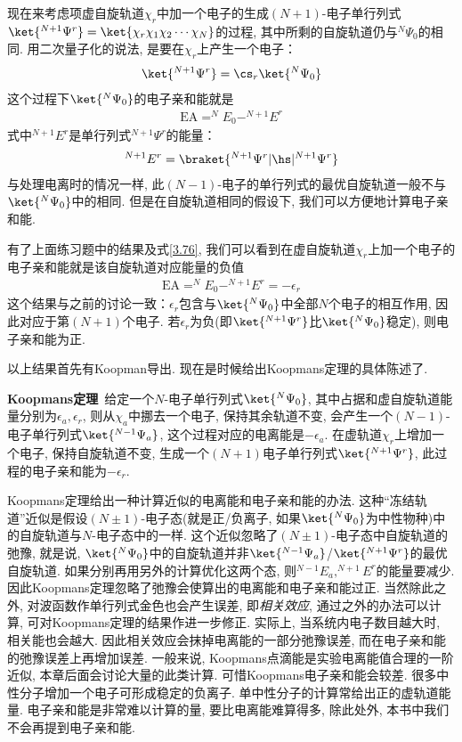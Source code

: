 现在来考虑项虚自旋轨道$\chi_r$中加一个电子的生成$(N+1)$-电子单行列式$\ket{^{N+1}\Psi^r}=\ket{\chi_r\chi_1\chi_2\cdots\chi_N}$的过程, 其中所剩的自旋轨道仍与$^N\Psi_0$的相同. 用二次量子化的说法, 是要在$\chi_r$上产生一个电子：
\begin{align}
\ket{^{N+1}\Psi^r} = \cs_r\ket{^N\Psi_0}
\end{align}
这个过程下$\ket{^N\Psi_0}$的电子亲和能就是
\begin{align}
\mathrm{EA} = ^NE_0 - ^{N+1}E^r
\end{align}
式中$ ^{N+1}E^r$是单行列式$^{N+1}\Psi^r$的能量：
\begin{align}
 ^{N+1}E^r = \braket{^{N+1}\Psi^r|\hs|^{N+1}\Psi^r}
\end{align}
与处理电离时的情况一样, 此$(N-1)$-电子的单行列式的最优自旋轨道一般不与$\ket{^N\Psi_0}$中的相同. 但是在自旋轨道相同的假设下, 我们可以方便地计算电子亲和能.

有了上面练习题中的结果及式\eqref{3.76}, 我们可以看到在虚自旋轨道$\chi_r$上加一个电子的电子亲和能就是该自旋轨道对应能量的负值
\begin{align}
\mathrm{EA} = ^{N}E_0 - ^{N+1}E^r = -\epsilon_r
\end{align}
这个结果与之前的讨论一致：$\epsilon_r$包含与$\ket{^N\Psi_0}$中全部$N$个电子的相互作用, 因此对应于第$(N+1)$个电子. 若$\epsilon_r$为负(即$\ket{^{N+1}\Psi^r}$比$\ket{^N\Psi_0}$稳定), 则电子亲和能为正.

以上结果首先有Koopman导出. 现在是时候给出Koopmans定理的具体陈述了.

\textbf{Koopmans定理}\ 给定一个$N$-电子\hft 单行列式$\ket{^N\Psi_0}$, 其中占据和虚自旋轨道能量分别为$\epsilon_a,\epsilon_r$, 则从$\chi_a$中挪去一个电子, 保持其余轨道不变, 会产生一个$(N-1)$-电子单行列式$\ket{^{N-1}\Psi_a}$, 这个过程对应的电离能是$-\epsilon_a$. 在虚轨道$\chi_r$上增加一个电子, 保持自旋轨道不变, 生成一个$(N+1)$电子单行列式$\ket{^{N+1}\Psi^r}$, 此过程的电子亲和能为$-\epsilon_r$.

Koopmans定理给出一种计算近似的电离能和电子亲和能的办法. 这种“冻结轨道”近似是假设$(N\pm1)$-电子态(就是正/负离子, 如果$\ket{^N\Psi_0}$为中性物种)中的自旋轨道与$N$-电子态中的一样. 这个近似忽略了$(N\pm1)$-电子态中自旋轨道的弛豫, 就是说, $\ket{^N\Psi_0}$中的自旋轨道并非$\ket{^{N-1}\Psi_a}$/$\ket{^{N+1}\Psi^r}$的最优自旋轨道. 如果分别再用另外的\hft 计算优化这两个态, 则$^{N-1}E_a,^{N+1}E^r$的能量要减少. 因此Koopmans定理忽略了弛豫会使算出的电离能和电子亲和能过正. 当然除此之外, 对波函数作单行列式金色也会产生误差, 即\emph{相关效应}, 通过\hft 之外的办法可以计算, 可对Koopmans定理的结果作进一步修正. 实际上, 当系统内电子数目越大时, 相关能也会越大. 因此相关效应会抹掉电离能的一部分弛豫误差, 而在电子亲和能的弛豫误差上再增加误差. 一般来说, Koopmans点滴能是实验电离能值合理的一阶近似, 本章后面会讨论大量的此类计算. 可惜Koopmans电子亲和能会较差. 很多中性分子增加一个电子可形成稳定的负离子. 单中性分子的\hft 计算常给出正的虚轨道能量. 电子亲和能是非常难以计算的量, 要比电离能难算得多, 除此处外, 本书中我们不会再提到电子亲和能.

